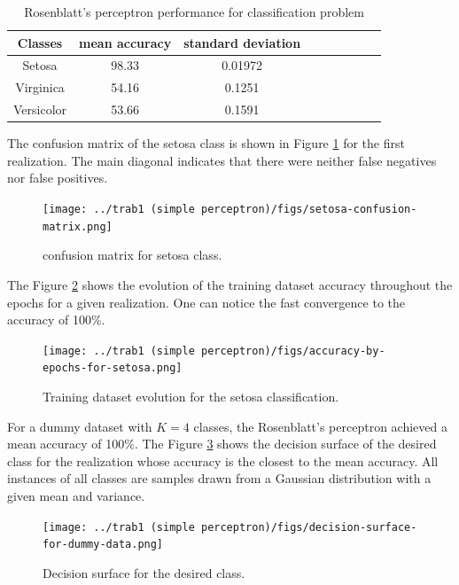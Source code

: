 \documentclass[12pt,a4paper]{article}
\begin{document}
\begin{table}
	\centering
	\caption{Rosenblatt's perceptron performance for classification problem}
	\footnotesize
	\setlength{\tabcolsep}{5pt}
	\begin{tabular}{ccccccccc}
		\hline
		Classes & mean accuracy & standard deviation \\
		\hline
		Setosa & 98.33 & 0.01972 \\
        \hline
		Virginica & 54.16 & 0.1251 \\
		\hline
		Versicolor & 53.66 & 0.1591 \\
		\hline
	\end{tabular} \label{tab:rosenblatt-results}
\end{table}

The confusion matrix of the setosa class is shown in Figure \ref{fig:confusion-matrix-setosa} for the first realization. The main diagonal indicates that there were neither false negatives nor false positives.

\begin{figure}[H]
    \centering
    \texttt{[image: ../trab1 (simple perceptron)/figs/setosa-confusion-matrix.png]}
    \caption{confusion matrix for setosa class.}
    \label{fig:confusion-matrix-setosa}
\end{figure}

The Figure \ref{fig:setosa-training-evolution} shows the evolution of the training dataset accuracy throughout the epochs for a given realization. One can notice the fast convergence to the accuracy of 100\%.

\begin{figure}[H]
    \centering
    \texttt{[image: ../trab1 (simple perceptron)/figs/accuracy-by-epochs-for-setosa.png]}
    \caption{Training dataset evolution for the setosa classification.}
    \label{fig:setosa-training-evolution}
\end{figure}

For a dummy dataset with \(K=4\) classes, the Rosenblatt's perceptron achieved a mean accuracy of 100\%. The Figure \ref{fig:decision-surface-dummy-data} shows the decision surface of the desired class for the realization whose accuracy is the closest to the mean accuracy. All instances of all classes are samples drawn from a Gaussian distribution with a given mean and variance.

\begin{figure}[H]
    \centering
    \texttt{[image: ../trab1 (simple perceptron)/figs/decision-surface-for-dummy-data.png]}
    \caption{Decision surface for the desired class.}
    \label{fig:decision-surface-dummy-data}
\end{figure}
\end{document}
